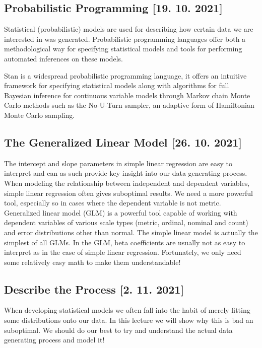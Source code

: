 \documentclass[fleqn,moreauthors,10pt]{ds_report}
\begin{document}
\subsection*{Probabilistic Programming [19. 10. 2021]}

Statistical (probabilistic) models are used for describing how certain data we are interested in was generated. Probabilistic programming languages offer both a methodological way for specifying statistical models and tools for performing automated inferences on these models.

Stan is a widespread probabilistic programming language, it offers an intuitive framework for specifying statistical models along with algorithms for full Bayesian inference for continuous variable models through Markov chain Monte Carlo methods such as the No-U-Turn sampler, an adaptive form of Hamiltonian Monte Carlo sampling.

\subsection*{The Generalized Linear Model [26. 10. 2021]}

The intercept and slope parameters in simple linear regression are easy to interpret and can as such provide key insight into our data generating process. When modeling the relationship between independent and dependent variables, simple linear regression often gives suboptimal results. We need a more powerful tool, especially so in cases where the dependent variable is not metric. Generalized linear model (GLM) is a powerful tool capable of working with dependent variables of various scale types (metric, ordinal, nominal and count) and error distributions other than normal. The simple linear model is actually the simplest of all GLMs. In the GLM, beta coefficients are usually not as easy to interpret as in the case of simple linear regression. Fortunately, we only need some relatively easy math to make them understandable!

\subsection*{Describe the Process [2. 11. 2021]}

When developing statistical models we often fall into the habit of merely fitting some distributions onto our data. In this lecture we will show why this is bad an suboptimal. We should do our best to try and understand the actual data generating process and model it!
\end{document}
